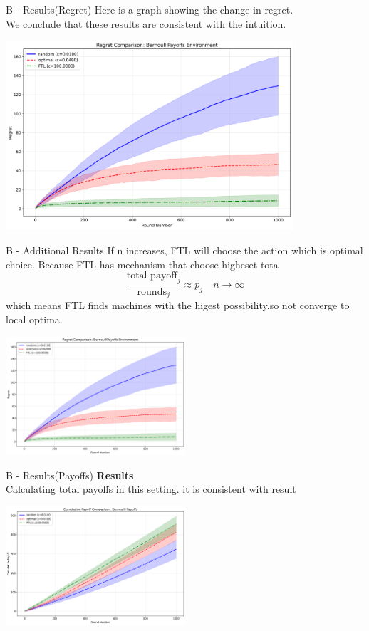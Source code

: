 \documentclass{beamer}
\begin{document}
\begin{frame}{B - Results(Regret)}
Here is a graph showing the change in regret. \\
We conclude that these results are consistent with the intuition. \\
\begin{center}
    \includegraphics[width=0.8\textwidth]{../figures/bernoulli_regret_comparison.png}
\end{center}
\end{frame}

\begin{frame}{B - Additional Results}
If n increases,  FTL will choose the action which is  optimal choice.
Because FTL has mechanism that choose higheset tota
\[
\frac{\text{total payoff}_j}{\text{rounds}_j} \approx p_j \quad n \rightarrow\infty
\]
which means FTL finds machines with the higest possibility.so not converge to local optima.
\begin{center}
    \includegraphics[width=0.5\textwidth]{../figures/bernoulli_regret_comparison.png}
\end{center}
\end{frame}

\begin{frame}{B - Results(Payoffs)}
\textbf{Results}\\
Calculating total payoffs in this setting. it is consistent with result
\begin{center}
    \includegraphics[width=0.5\textwidth]{figures/BP_payoff.png}
\end{center}
\end{frame}
\end{document}
